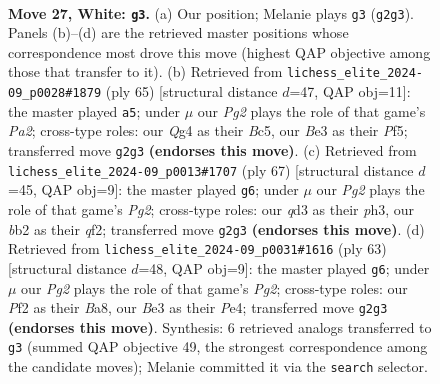 \documentclass[11pt]{article}
\begin{document}
\clearpage

\begin{figure}[p]\centering
\begin{subfigure}{0.46\textwidth}\centering
\resizebox{\linewidth}{!}{%
\newchessgame
\chessboard[
  setfen={r7/2p2kpp/3p4/8/pP4Q1/3qB3/Pb3PPP/6K1 w - - 0 27},
  showmover=false,
  pgfstyle=straightmove, color=movearrow, markmove={g2-g3}
]}
\caption{}
\end{subfigure}\hfill
\begin{subfigure}{0.46\textwidth}\centering
\resizebox{\linewidth}{!}{%
\newchessgame
\chessboard[
  setfen={8/p4pkp/8/1pb1Pp2/5Q2/1KP3P1/P3q2P/R7 b - - 1 33},
  showmover=false,
  pgfstyle=straightmove, color=movearrow, markmove={a7-a5}
]}
\caption{}
\end{subfigure}
\\[4pt]
\begin{subfigure}{0.46\textwidth}\centering
\resizebox{\linewidth}{!}{%
\newchessgame
\chessboard[
  setfen={6k1/6p1/2p5/2Pp2qp/3Pb3/7P/5QPK/3B4 b - - 5 34},
  showmover=false,
  pgfstyle=straightmove, color=movearrow, markmove={g7-g6}
]}
\caption{}
\end{subfigure}\hfill
\begin{subfigure}{0.46\textwidth}\centering
\resizebox{\linewidth}{!}{%
\newchessgame
\chessboard[
  setfen={b6k/4q1pp/5p2/1p6/3QpPB1/2P4P/1P4P1/6K1 b - - 4 32},
  showmover=false,
  pgfstyle=straightmove, color=movearrow, markmove={g7-g6}
]}
\caption{}
\end{subfigure}
\caption{\textbf{Move 27, White: \texttt{g3}.} (a) Our position; Melanie plays \texttt{g3} (\texttt{g2g3}). Panels (b)--(d) are the retrieved master positions whose correspondence most drove this move (highest QAP objective among those that transfer to it). (b) Retrieved from \texttt{lichess\_elite\_2024-09\_p0028\#1879} (ply 65) [structural distance $d$=47, QAP obj=11]: the master played \texttt{a5}; under $\mu$ our \emph{Pg2} plays the role of that game's \emph{Pa2}; cross-type roles: our \emph{Q}g4 as their \emph{B}c5, our \emph{B}e3 as their \emph{P}f5; transferred move \texttt{g2g3} \textbf{(endorses this move)}. (c) Retrieved from \texttt{lichess\_elite\_2024-09\_p0013\#1707} (ply 67) [structural distance $d$=45, QAP obj=9]: the master played \texttt{g6}; under $\mu$ our \emph{Pg2} plays the role of that game's \emph{Pg2}; cross-type roles: our \emph{q}d3 as their \emph{p}h3, our \emph{b}b2 as their \emph{q}f2; transferred move \texttt{g2g3} \textbf{(endorses this move)}. (d) Retrieved from \texttt{lichess\_elite\_2024-09\_p0031\#1616} (ply 63) [structural distance $d$=48, QAP obj=9]: the master played \texttt{g6}; under $\mu$ our \emph{Pg2} plays the role of that game's \emph{Pg2}; cross-type roles: our \emph{P}f2 as their \emph{B}a8, our \emph{B}e3 as their \emph{P}e4; transferred move \texttt{g2g3} \textbf{(endorses this move)}. Synthesis: 6 retrieved analogs transferred to \texttt{g3} (summed QAP objective 49, the strongest correspondence among the candidate moves); Melanie committed it via the \texttt{search} selector.}
\label{fig:thought-m52}
\end{figure}
\end{document}
